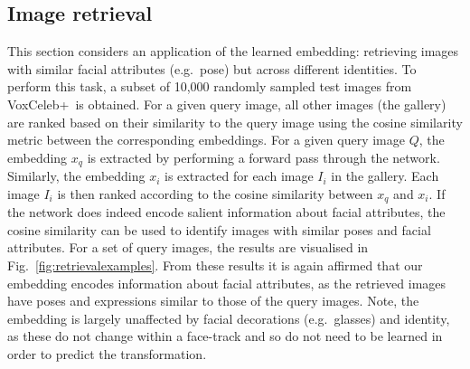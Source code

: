 \documentclass{bmvc2k}
\newcommand{\figref}[1]{Fig.~\ref{#1}}
\def\voxcombiname{VoxCeleb+}
\begin{document}
\subsection{Image retrieval}
\label{exp:informationretrieval}
This section considers an application of the learned embedding:
retrieving images with similar facial attributes (e.g.~pose) but
across different identities.  To perform this task, a subset of 10,000
randomly sampled test images from \voxcombiname~is obtained.  For a
given query image, all other images (the gallery) are ranked based on
their similarity to the query image using the cosine similarity metric
between the corresponding embeddings.  For a given query image $Q$,
the embedding $x_q$ is extracted by performing a forward pass through
the network.  Similarly, the embedding $x_i$ is extracted for each
image $I_i$ in the gallery.  Each image $I_i$ is then ranked according
to the cosine similarity between $x_q$ and $x_i$.  If the network does
indeed encode salient information about facial attributes, the cosine
similarity can be used to identify images with similar poses and
facial attributes.  For a set of query images, the results are
visualised in \figref{fig:retrievalexamples}.  From these results it
is again affirmed that our embedding encodes information about facial
attributes, as the retrieved images have poses and expressions similar
to those of the query images.
Note, the embedding is largely unaffected by facial
decorations (e.g.\ glasses) and identity, as these do not change within a face-track and so do not need to be learned in order to predict the transformation.
\end{document}
